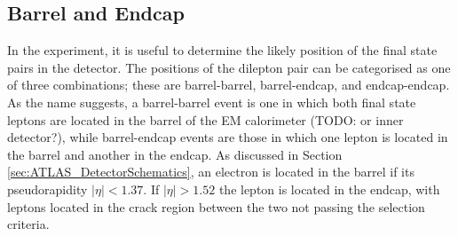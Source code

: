 \documentclass{article}
\begin{document}
\subsection{Barrel and Endcap}

In the experiment, it is useful to determine the likely position of the final state pairs in the detector. The positions of the dilepton pair can be categorised as one of three combinations; these are barrel-barrel, barrel-endcap, and endcap-endcap. As the name suggests, a barrel-barrel event is one in which both final state leptons are located in the barrel of the EM calorimeter (TODO: or inner detector?), while barrel-endcap events are those in which one lepton is located in the barrel and another in the endcap. As discussed in Section \ref{sec:ATLAS_DetectorSchematics}, an electron is located in the barrel if its pseudorapidity $|\eta|<1.37$. If $|\eta|>1.52$ the lepton is located in the endcap, with leptons located in the crack region between the two not passing the selection criteria.
\end{document}

